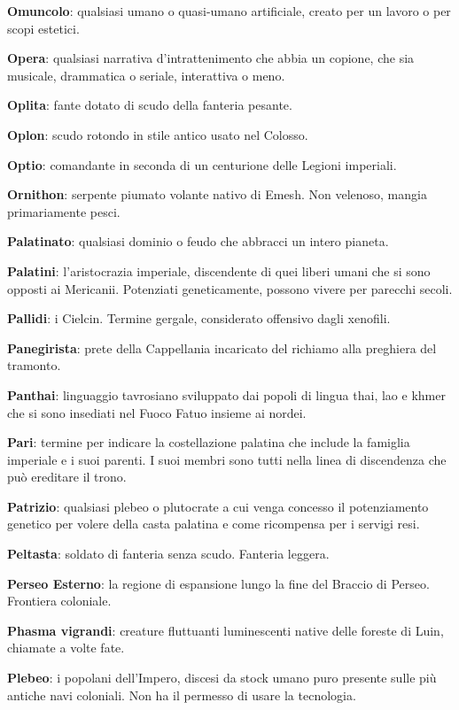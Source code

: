 \textbf{Omuncolo}: qualsiasi umano o quasi-umano artificiale, creato per
un lavoro o per scopi estetici.

\textbf{Opera}: qualsiasi narrativa d'intrattenimento che abbia un
copione, che sia musicale, drammatica o seriale, interattiva o meno.

\textbf{Oplita}: fante dotato di scudo della fanteria pesante.

\textbf{Oplon}: scudo rotondo in stile antico usato nel Colosso.

\textbf{Optio}: comandante in seconda di un centurione delle Legioni
imperiali.

\textbf{Ornithon}: serpente piumato volante nativo di Emesh. Non
velenoso, mangia primariamente pesci.

\textbf{Palatinato}: qualsiasi dominio o feudo che abbracci un intero
pianeta.

\textbf{Palatini}: l'aristocrazia imperiale, discendente di quei liberi
umani che si sono opposti ai Mericanii. Potenziati geneticamente,
possono vivere per parecchi secoli.

\textbf{Pallidi}: i Cielcin. Termine gergale, considerato offensivo
dagli xenofili.

\textbf{Panegirista}: prete della Cappellania incaricato del richiamo
alla preghiera del tramonto.

\textbf{Panthai}: linguaggio tavrosiano sviluppato dai popoli di lingua
thai, lao e khmer che si sono insediati nel Fuoco Fatuo insieme ai
nordei.

\textbf{Pari}: termine per indicare la costellazione palatina che
include la famiglia imperiale e i suoi parenti. I suoi membri sono tutti
nella linea di discendenza che può ereditare il trono.

\textbf{Patrizio}: qualsiasi plebeo o plutocrate a cui venga concesso il
potenziamento genetico per volere della casta palatina e come ricompensa
per i servigi resi.

\textbf{Peltasta}: soldato di fanteria senza scudo. Fanteria leggera.

\textbf{Perseo Esterno}: la regione di espansione lungo la fine del
Braccio di Perseo. Frontiera coloniale.

\textbf{Phasma vigrandi}: creature fluttuanti luminescenti native delle
foreste di Luin, chiamate a volte fate.

\textbf{Plebeo}: i popolani dell'Impero, discesi da stock umano puro
presente sulle più antiche navi coloniali. Non ha il permesso di usare
la tecnologia.

